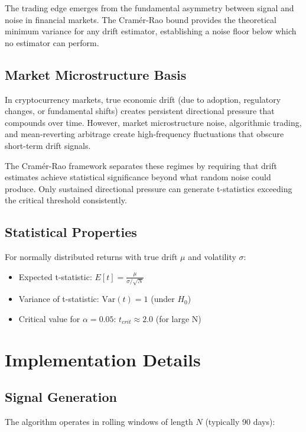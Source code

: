 \documentclass{article}
\begin{document}
The trading edge emerges from the fundamental asymmetry between signal and noise in financial markets. The Cramér-Rao bound provides the theoretical minimum variance for any drift estimator, establishing a noise floor below which no estimator can perform.

\subsection{Market Microstructure Basis}

In cryptocurrency markets, true economic drift (due to adoption, regulatory changes, or fundamental shifts) creates persistent directional pressure that compounds over time. However, market microstructure noise, algorithmic trading, and mean-reverting arbitrage create high-frequency fluctuations that obscure short-term drift signals.

The Cramér-Rao framework separates these regimes by requiring that drift estimates achieve statistical significance beyond what random noise could produce. Only sustained directional pressure can generate t-statistics exceeding the critical threshold consistently.

\subsection{Statistical Properties}

For normally distributed returns with true drift $\mu$ and volatility $\sigma$:

\begin{itemize}
\item Expected t-statistic: $E[t] = \frac{\mu}{\sigma/\sqrt{N}}$
\item Variance of t-statistic: $\text{Var}(t) = 1$ (under $H_0$)
\item Critical value for $\alpha = 0.05$: $t_{crit} \approx 2.0$ (for large N)
\end{itemize}

\section{Implementation Details}

\subsection{Signal Generation}

The algorithm operates in rolling windows of length $N$ (typically 90 days):
\end{document}

